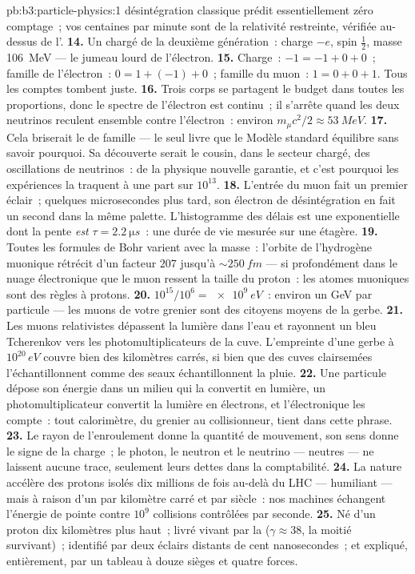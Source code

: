 \begin{solution}{pb:b3:particle-physics:1}
désintégration classique prédit essentiellement zéro comptage~; vos
centaines par minute sont de la relativité restreinte, vérifiée
au-dessus de l'.
\textbf{14.} Un  chargé de la deuxième génération~: charge
$-e$, spin $\tfrac12$, masse \qty{106}{MeV} --- le jumeau lourd de
l'électron.
\textbf{15.} Charge~: $-1 = -1 + 0 + 0$~; famille de l'électron~:
$0 = 1 + (-1) + 0$~; famille du muon~: $1 = 0 + 0 + 1$. Tous les
comptes tombent juste.
\textbf{16.} Trois corps se partagent le budget dans toutes les
proportions, donc le spectre de l'électron est continu~; il s'arrête
quand les deux neutrinos reculent ensemble contre l'électron~:
environ $m_\mu c^2/2 \approx \qty{53}{MeV}$.
\textbf{17.} Cela briserait le  de famille --- le
seul livre que le Modèle standard équilibre sans savoir pourquoi.
Sa découverte serait le cousin, dans le secteur chargé, des
oscillations de neutrinos~: de la physique nouvelle garantie, et
c'est pourquoi les expériences la traquent à une part sur $10^{13}$.
\textbf{18.} L'entrée du muon fait un premier éclair~; quelques
microsecondes plus tard, son électron de désintégration en fait un
second dans la même palette. L'histogramme des délais est une
exponentielle dont la pente \emph{est} $\tau = \qty{2.2}{\micro s}$~:
une durée de vie mesurée sur une étagère.
\textbf{19.} Toutes les formules de Bohr varient avec la masse~:
l'orbite de l'hydrogène muonique rétrécit d'un facteur $207$ jusqu'à
${\sim}\qty{250}{fm}$ --- si profondément dans le nuage électronique
que le muon ressent la taille du proton~: les atomes muoniques sont
des règles à protons.
\textbf{20.} $10^{15}/10^{6} = \qty{e9}{eV}$~: environ un GeV par
particule --- les muons de votre grenier sont des citoyens moyens de
la gerbe.
\textbf{21.} Les muons relativistes dépassent la lumière dans l'eau
et rayonnent un bleu Tcherenkov vers les photomultiplicateurs de la
cuve. L'empreinte d'une gerbe à $10^{20}\,\unit{eV}$ couvre bien des
kilomètres carrés, si bien que des cuves clairsemées
l'échantillonnent comme des seaux échantillonnent la pluie.
\textbf{22.} Une particule dépose son énergie dans un milieu qui la
convertit en lumière, un photomultiplicateur convertit la lumière en
électrons, et l'électronique les compte~: tout calorimètre, du
grenier au collisionneur, tient dans cette phrase.
\textbf{23.} Le rayon de l'enroulement donne la quantité de
mouvement, son sens donne le signe de la charge~; le photon, le
neutron et le neutrino --- neutres --- ne laissent aucune trace,
seulement leurs dettes dans la comptabilité.
\textbf{24.} La nature accélère des protons isolés dix millions de
fois au-delà du LHC --- humiliant --- mais à raison d'un par
kilomètre carré et par siècle~: nos machines échangent l'énergie de
pointe contre $10^{9}$ collisions contrôlées par seconde.
\textbf{25.} Né d'un proton dix kilomètres plus haut~; livré vivant
par la  ($\gamma \approx 38$, la moitié
survivant)~; identifié par deux éclairs distants de cent
nanosecondes~; et expliqué, entièrement, par un tableau à douze
sièges et quatre forces.
\end{solution}
